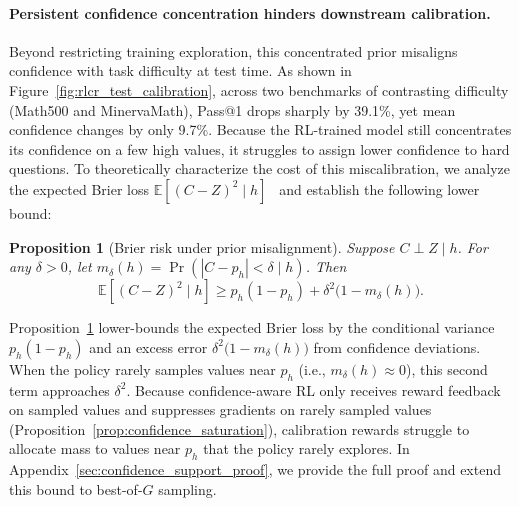 \documentclass{article} %
\newtheorem{proposition}{Proposition}
\begin{document}
\paragraph{Persistent confidence concentration hinders downstream calibration.}
Beyond restricting training exploration, this concentrated prior misaligns confidence with task difficulty at test time.
As shown in Figure~\ref{fig:rlcr_test_calibration}, across two benchmarks of contrasting difficulty (Math500 and MinervaMath), Pass@1 drops sharply by 39.1\%, yet mean confidence changes by only 9.7\%.
Because the RL-trained model still concentrates its confidence on a few high values, it struggles to assign lower confidence to hard questions.
To theoretically characterize the cost of this miscalibration,
we analyze the expected Brier loss $\mathbb E[(C-Z)^2 \mid h]$~\citep{gneiting2007strictly} and establish the following lower bound:

\begin{proposition}[Brier risk under prior misalignment]
\label{prop:confidence_support}
Suppose $C \perp Z \mid h$. For any $\delta > 0$, let $m_\delta(h) = \Pr(|C - p_h| < \delta \mid h)$. Then
\begin{equation}
    \label{eq:brier_lower_bound}
    \mathbb E[(C-Z)^2 \mid h] \ge p_h(1-p_h) + \delta^2 \bigl(1-m_\delta(h)\bigr).
\end{equation}
\end{proposition}

Proposition~\ref{prop:confidence_support} lower-bounds the expected Brier loss 
by the conditional variance $p_h(1-p_h)$ and an excess error $\delta^2\bigl(1-m_\delta(h)\bigr)$ from confidence deviations.
When the policy rarely samples values near $p_h$ (i.e., $m_\delta(h)\approx 0$), this second term approaches $\delta^2$.
Because confidence-aware RL only receives reward feedback on sampled values and suppresses gradients on rarely sampled values (Proposition~\ref{prop:confidence_saturation}), calibration rewards struggle to allocate mass to values near $p_h$ that the policy rarely explores.
In Appendix~\ref{sec:confidence_support_proof}, we provide the full proof and extend this bound to best-of-$G$ sampling.
\end{document}
